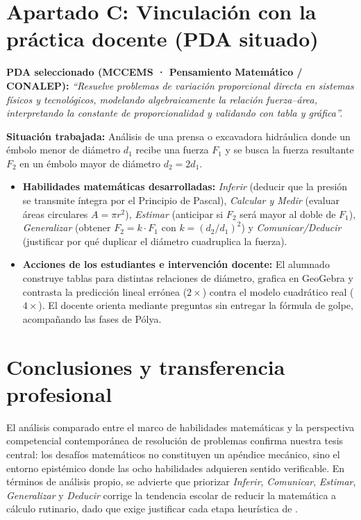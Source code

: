 \documentclass[spanish,letterpaper,oneside]{article}
\begin{document}
\section{Apartado C: Vinculación con la práctica docente (PDA situado)}
\textbf{PDA seleccionado (MCCEMS · Pensamiento Matemático / CONALEP):} \textit{``Resuelve problemas de variación proporcional directa en sistemas físicos y tecnológicos, modelando algebraicamente la relación fuerza--área, interpretando la constante de proporcionalidad y validando con tabla y gráfica''.}

\textbf{Situación trabajada:} Análisis de una prensa o excavadora hidráulica donde un émbolo menor de diámetro $d_1$ recibe una fuerza $F_1$ y se busca la fuerza resultante $F_2$ en un émbolo mayor de diámetro $d_2 = 2 d_1$.
\begin{itemize}
  \item \textbf{Habilidades matemáticas desarrolladas:} \textit{Inferir} (deducir que la presión se transmite íntegra por el Principio de Pascal), \textit{Calcular y Medir} (evaluar áreas circulares $A = \pi r^2$), \textit{Estimar} (anticipar si $F_2$ será mayor al doble de $F_1$), \textit{Generalizar} (obtener $F_2 = k\cdot F_1$ con $k = (d_2/d_1)^2$) y \textit{Comunicar/Deducir} (justificar por qué duplicar el diámetro cuadruplica la fuerza).
  \item \textbf{Acciones de los estudiantes e intervención docente:} El alumnado construye tablas para distintas relaciones de diámetro, grafica en GeoGebra y contrasta la predicción lineal errónea ($2\times$) contra el modelo cuadrático real ($4\times$). El docente orienta mediante preguntas sin entregar la fórmula de golpe, acompañando las fases de Pólya.
\end{itemize}

\clearpage
\section{Conclusiones y transferencia profesional}
El análisis comparado entre el marco de habilidades matemáticas \citep{sep1994} y la perspectiva competencial contemporánea de resolución de problemas \citep{alsina2023} confirma nuestra tesis central: los desafíos matemáticos no constituyen un apéndice mecánico, sino el entorno epistémico donde las ocho habilidades adquieren sentido verificable. En términos de análisis propio, se advierte que priorizar \textit{Inferir}, \textit{Comunicar}, \textit{Estimar}, \textit{Generalizar} y \textit{Deducir} corrige la tendencia escolar de reducir la matemática a cálculo rutinario, dado que exige justificar cada etapa heurística de \citet{polya1945}.
\end{document}
